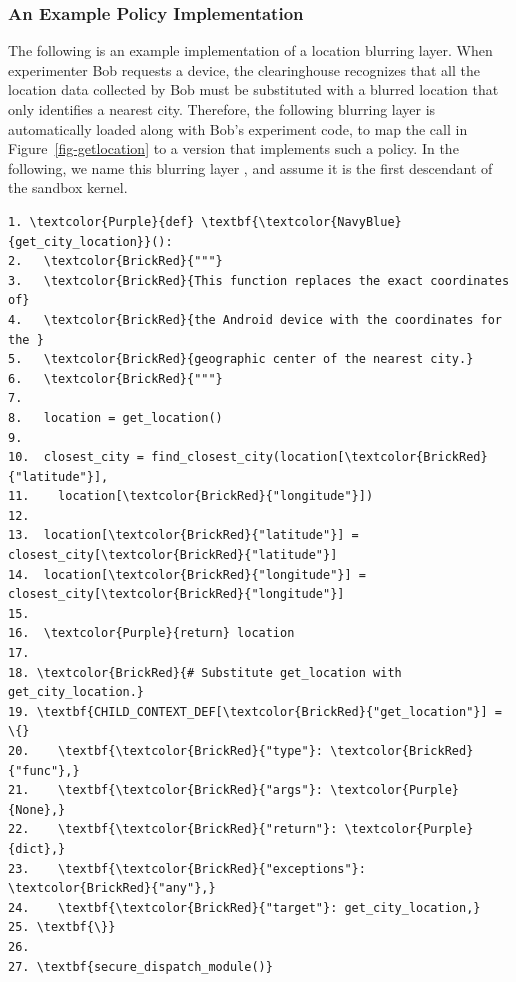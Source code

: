 \subsubsection{An Example Policy Implementation}
\label{sec-precision-example}


The following is an example implementation of a location blurring layer. 
When experimenter Bob requests a device, the clearinghouse recognizes that all the location data
collected by Bob must be substituted with a blurred location that only identifies a nearest city.
Therefore, the following blurring layer is
automatically loaded along with Bob's experiment code, to map 
the  call in Figure~\ref{fig-getlocation} to a version 
that implements such a policy. In the following, we name this
blurring layer , and assume it is the first descendant
of the sandbox kernel.

\begin{Verbatim}
1. \textcolor{Purple}{def} \textbf{\textcolor{NavyBlue}{get_city_location}}():
2.   \textcolor{BrickRed}{"""}
3.   \textcolor{BrickRed}{This function replaces the exact coordinates of} 
4.   \textcolor{BrickRed}{the Android device with the coordinates for the } 
5.   \textcolor{BrickRed}{geographic center of the nearest city.}
6.   \textcolor{BrickRed}{"""}
7.
8.   location = get_location()
9.
10.  closest_city = find_closest_city(location[\textcolor{BrickRed}{"latitude"}],
11.    location[\textcolor{BrickRed}{"longitude"}])
12.
13.  location[\textcolor{BrickRed}{"latitude"}] = closest_city[\textcolor{BrickRed}{"latitude"}]
14.  location[\textcolor{BrickRed}{"longitude"}] = closest_city[\textcolor{BrickRed}{"longitude"}]
15.
16.  \textcolor{Purple}{return} location
17.
18. \textcolor{BrickRed}{# Substitute get_location with get_city_location.}
19. \textbf{CHILD_CONTEXT_DEF[\textcolor{BrickRed}{"get_location"}] = \{}
20.    \textbf{\textcolor{BrickRed}{"type"}: \textcolor{BrickRed}{"func"},}
21.    \textbf{\textcolor{BrickRed}{"args"}: \textcolor{Purple}{None},}
22.    \textbf{\textcolor{BrickRed}{"return"}: \textcolor{Purple}{dict},}
23.    \textbf{\textcolor{BrickRed}{"exceptions"}: \textcolor{BrickRed}{"any"},}
24.    \textbf{\textcolor{BrickRed}{"target"}: get_city_location,}
25. \textbf{\}}
26.
27. \textbf{secure_dispatch_module()}
\end{Verbatim}


